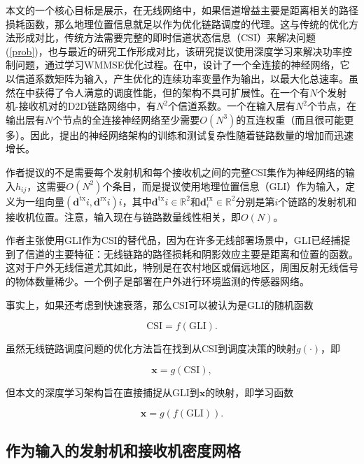 \documentclass[UTF8, 12pt]{article}
\numberwithin{figure}{section}
\begin{document}
  本文的一个核心目标是展示，在无线网络中，如果信道增益主要是距离相关的路径损耗函数，那么地理位置信息就足以作为优化链路调度的代理。这与传统的优化方法形成对比，传统方法需要完整的即时信道状态信息（CSI）来解决问题 (\ref{prob})，也与最近的研究工作\cite{hong_spawc}形成对比，该研究提议使用深度学习来解决功率控制问题，通过学习WMMSE优化过程。在\cite{hong_spawc}中，设计了一个全连接的神经网络，它以信道系数矩阵为输入，产生优化的连续功率变量作为输出，以最大化总速率。虽然在\cite{hong_spawc}中获得了令人满意的调度性能，但\cite{hong_spawc}的架构不具可扩展性。在一个有$N$个发射机-接收机对的D2D链路网络中，有$N^2$个信道系数。一个在输入层有$N^2$个节点，在输出层有$N$个节点的全连接神经网络至少需要$O(N^3)$的互连权重（而且很可能更多）。因此，\cite{hong_spawc}提出的神经网络架构的训练和测试复杂性随着链路数量的增加而迅速增长。
  
  作者提议的不是需要每个发射机和每个接收机之间的完整CSI集作为神经网络的输入${h_{ij}}$，这需要$O(N^2)$个条目，而是提议使用地理位置信息（GLI）作为输入，定义为一组向量${(\mathbf d^{\text{tx}}{i},\mathbf d^{\text{rx}}{i})}i$，其中$\mathbf d^{\text{tx}}{i}\in\mathbb R^2$和$\mathbf d^{\text{rx}}_{i}\in\mathbb R^2$分别是第$i$个链路的发射机和接收机位置。注意，输入现在与链路数量线性相关，即$O(N)$。
  
  作者主张使用GLI作为CSI的替代品，因为在许多无线部署场景中，GLI已经捕捉到了信道的主要特征：无线链路的路径损耗和阴影效应主要是距离和位置的函数。这对于户外无线信道尤其如此，特别是在农村地区或偏远地区，周围反射无线信号的物体数量稀少。一个例子是部署在户外进行环境监测的传感器网络。
  
  事实上，如果还考虑到快速衰落，那么CSI可以被认为是GLI的随机函数

  \begin{equation}
  \text{CSI} = f(\text{GLI}).
  \end{equation}

  虽然无线链路调度问题的优化方法旨在找到从CSI到调度决策的映射$g(\cdot)$，即

  \begin{equation}
  \mathbf x = g(\text{CSI}),
  \end{equation}

  但本文的深度学习架构旨在直接捕捉从GLI到$\mathbf x$的映射，即学习函数
  
  \begin{equation}
  \mathbf x = g(f(\text{GLI})).
  \end{equation}



\subsection{作为输入的发射机和接收机密度网格}
\end{document}
